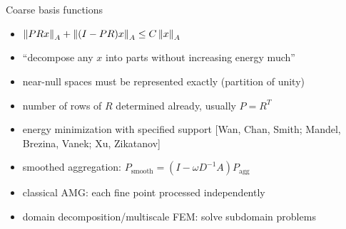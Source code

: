 \begin{frame}{Coarse basis functions}
  \begin{itemize}
  \item $\left\lVert PR x \right\rVert_A + \left\lVert (I - PR)x \right\rVert_A \le C \left\lVert x \right\rVert_A$
  \item ``decompose any $x$ into parts without increasing energy much''
  \item near-null spaces must be represented exactly (partition of unity)
  \item number of rows of $R$ determined already, usually $P = R^T$
  \item energy minimization with specified support [Wan, Chan, Smith; Mandel, Brezina, Vanek; Xu, Zikatanov]
  \item smoothed aggregation: $P_{\text{smooth}} = (I - \omega D^{-1} A) P_{\text{agg}}$
  \item classical AMG: each fine point processed independently
  \item domain decomposition/multiscale FEM: solve subdomain problems
  \end{itemize}
\end{frame}
